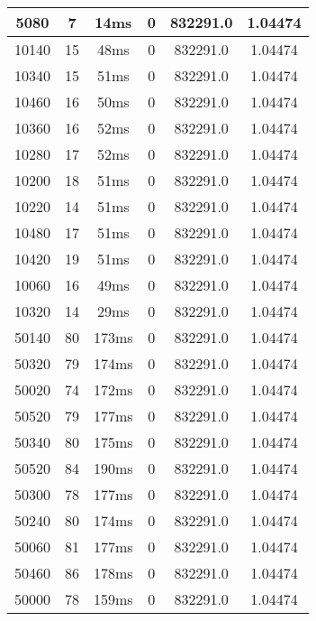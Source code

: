 \documentclass[./main.tex]{subfiles}
\begin{document}
\begin{table}
\begin{tabular}{ c | c | c | c | c | c }
        \rowcolor{lightgray} 5080 & 7 & 14ms & 0 & 832291.0 & 1.04474 \\
        \hline
        \rowcolor{lightgray} 10140 & 15 & 48ms & 0 & 832291.0 & 1.04474 \\
        \rowcolor{lightgray} 10340 & 15 & 51ms & 0 & 832291.0 & 1.04474 \\
        \rowcolor{lightgray} 10460 & 16 & 50ms & 0 & 832291.0 & 1.04474 \\
        \rowcolor{lightgray} 10360 & 16 & 52ms & 0 & 832291.0 & 1.04474 \\
        \rowcolor{lightgray} 10280 & 17 & 52ms & 0 & 832291.0 & 1.04474 \\
        \rowcolor{lightgray} 10200 & 18 & 51ms & 0 & 832291.0 & 1.04474 \\
        \rowcolor{lightgray} 10220 & 14 & 51ms & 0 & 832291.0 & 1.04474 \\
        \rowcolor{lightgray} 10480 & 17 & 51ms & 0 & 832291.0 & 1.04474 \\
        \rowcolor{lightgray} 10420 & 19 & 51ms & 0 & 832291.0 & 1.04474 \\
        \rowcolor{lightgray} 10060 & 16 & 49ms & 0 & 832291.0 & 1.04474 \\
        \rowcolor{lightgray} 10320 & 14 & 29ms & 0 & 832291.0 & 1.04474 \\
        \hline
        \rowcolor{lightgray} 50140 & 80 & 173ms & 0 & 832291.0 & 1.04474 \\
        \rowcolor{lightgray} 50320 & 79 & 174ms & 0 & 832291.0 & 1.04474 \\
        \rowcolor{lightgray} 50020 & 74 & 172ms & 0 & 832291.0 & 1.04474 \\
        \rowcolor{lightgray} 50520 & 79 & 177ms & 0 & 832291.0 & 1.04474 \\
        \rowcolor{lightgray} 50340 & 80 & 175ms & 0 & 832291.0 & 1.04474 \\
        \rowcolor{lightgray} 50520 & 84 & 190ms & 0 & 832291.0 & 1.04474 \\
        \rowcolor{lightgray} 50300 & 78 & 177ms & 0 & 832291.0 & 1.04474 \\
        \rowcolor{lightgray} 50240 & 80 & 174ms & 0 & 832291.0 & 1.04474 \\
        \rowcolor{lightgray} 50060 & 81 & 177ms & 0 & 832291.0 & 1.04474 \\
        \rowcolor{lightgray} 50460 & 86 & 178ms & 0 & 832291.0 & 1.04474 \\
        \rowcolor{lightgray} 50000 & 78 & 159ms & 0 & 832291.0 & 1.04474 \\

\end{tabular}
\end{table}
\end{document}
